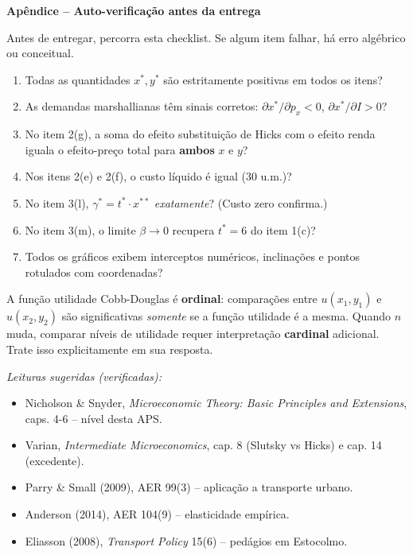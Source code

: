 \documentclass[11pt,addpoints]{exam}
\begin{document}
\newpage
\begin{center}\large\textbf{Apêndice -- Auto-verificação antes da entrega}\end{center}
\vspace{0.5em}

\noindent Antes de entregar, percorra esta checklist. Se algum item falhar, há erro algébrico ou conceitual.

\medskip
\begin{enumerate}[label=$\square$,leftmargin=*]
\item Todas as quantidades $x^*, y^*$ são estritamente positivas em todos os itens?
\item As demandas marshallianas têm sinais corretos: $\partial x^*/\partial p_x < 0$, $\partial x^*/\partial I > 0$?
\item No item 2(g), a soma do efeito substituição de Hicks com o efeito renda iguala o efeito-preço total para \textbf{ambos} $x$ e $y$?
\item Nos itens 2(e) e 2(f), o custo líquido é igual (30 u.m.)?
\item No item 3(l), $\gamma^* = t^* \cdot x^{**}$ \emph{exatamente}? (Custo zero confirma.)
\item No item 3(m), o limite $\beta \to 0$ recupera $t^* = 6$ do item 1(c)?
\item Todos os gráficos exibem interceptos numéricos, inclinações e pontos rotulados com coordenadas?
\end{enumerate}

\vspace{1em}
\begin{contextbox}
\small
A função utilidade Cobb-Douglas é \textbf{ordinal}: comparações entre $u(x_1, y_1)$ e $u(x_2, y_2)$ são significativas \textit{somente} se a função utilidade é a mesma. Quando $n$ muda, comparar níveis de utilidade requer interpretação \textbf{cardinal} adicional. Trate isso explicitamente em sua resposta.
\end{contextbox}

\vspace{1em}
\begin{contextbox}
\small
\textit{Leituras sugeridas (verificadas):}
\begin{itemize}[noitemsep,topsep=0pt]
\item Nicholson \& Snyder, \textit{Microeconomic Theory: Basic Principles and Extensions}, caps. 4-6 -- nível desta APS.
\item Varian, \textit{Intermediate Microeconomics}, cap. 8 (Slutsky vs Hicks) e cap. 14 (excedente).
\item Parry \& Small (2009), AER 99(3) -- aplicação a transporte urbano.
\item Anderson (2014), AER 104(9) -- elasticidade empírica.
\item Eliasson (2008), \textit{Transport Policy} 15(6) -- pedágios em Estocolmo.
\end{itemize}
\end{contextbox}
\end{document}
